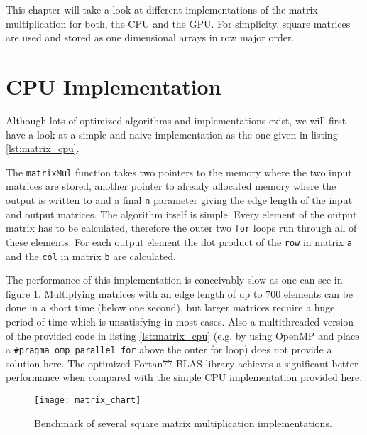 This chapter will take a look at different implementations of the matrix multiplication for both, the CPU and the GPU. For simplicity, square matrices are used and stored as one dimensional arrays in row major order.

\section{CPU Implementation}
\label{sec:matrix_cpu_implementation}

Although lots of optimized algorithms and implementations exist, we will first have a look at a simple and naive implementation as the one given in listing \ref{lst:matrix_cpu}.



The \lstinline!matrixMul! function takes two pointers to the memory where the two input matrices are stored, another pointer to already allocated memory where the output is written to and a final \lstinline!n! parameter giving the edge length of the input and output matrices.
The algorithm itself is simple. Every element of the output matrix has to be calculated, therefore the outer two \lstinline!for! loops run through all of these elements. For each output element the dot product of the \lstinline!row! in matrix \lstinline!a! and the \lstinline!col! in matrix \lstinline!b! are calculated.

The performance of this implementation is conceivably slow as one can see in figure \ref{fig:matrix_chart}. Multiplying matrices with an edge length of up to 700 elements can be done in a short time (below one second), but larger matrices require a huge period of time which is unsatisfying in most cases.
Also a multithreaded version of the provided code in listing \ref{lst:matrix_cpu} (e.g. by using OpenMP and place a \lstinline!#pragma omp parallel for! above the outer for loop) does not provide a solution here.
The optimized Fortan77 BLAS library \cite{blas_lib} achieves a significant better performance when compared with the simple CPU implementation provided here.

\begin{figure}
	\centering
	\texttt{[image: matrix\_chart]}
	\caption{Benchmark of several square matrix multiplication implementations.
	}
	\label{fig:matrix_chart}
\end{figure}

